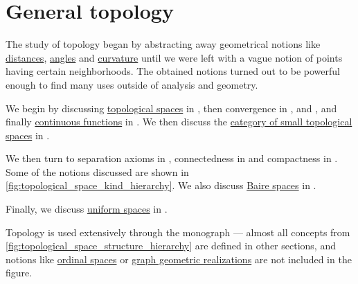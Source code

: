 \chapter{General topology}\label{ch:general_topology}

The study of topology began by abstracting away geometrical notions like \hyperref[def:metric_space]{distances}, \hyperref[def:angle]{angles} and \hyperref[def:regular_curve_curvature]{curvature} until we were left with a vague notion of points having certain neighborhoods. The obtained notions turned out to be powerful enough to find many uses outside of analysis and geometry.

We begin by discussing \hyperref[def:topological_space]{topological spaces} in , then convergence in ,  and , and finally \hyperref[def:global_continuity]{continuous functions} in . We then discuss the \hyperref[def:category_of_small_topological_spaces]{category of small topological spaces} in .

We then turn to separation axioms in , connectedness in  and compactness in . Some of the notions discussed are shown in \cref{fig:topological_space_kind_hierarchy}. We also discuss \hyperref[def:baire_space]{Baire spaces} in .

Finally, we discuss \hyperref[def:uniform_space]{uniform spaces} in .

Topology is used extensively through the monograph --- almost all concepts from \cref{fig:topological_space_structure_hierarchy} are defined in other sections, and notions like \hyperref[def:ordinal_space]{ordinal spaces} or \hyperref[def:graph_geometric_realization]{graph geometric realizations} are not included in the figure.

